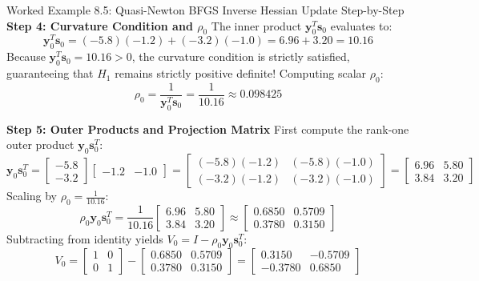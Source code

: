 \begin{examplebox}[breakable]{Worked Example 8.5: Quasi-Newton BFGS Inverse Hessian Update Step-by-Step}
\textbf{Step 4: Curvature Condition and $\rho_0$}
The inner product $\mathbf{y}_0^T \mathbf{s}_0$ evaluates to:
\begin{equation*}
\mathbf{y}_0^T \mathbf{s}_0 = (-5.8)(-1.2) + (-3.2)(-1.0) = 6.96 + 3.20 = \mathbf{10.16}
\end{equation*}
Because $\mathbf{y}_0^T \mathbf{s}_0 = 10.16 > 0$, the curvature condition is strictly satisfied, guaranteeing that $H_1$ remains strictly positive definite!
Computing scalar $\rho_0$:
\begin{equation*}
\rho_0 = \frac{1}{\mathbf{y}_0^T \mathbf{s}_0} = \frac{1}{10.16} \approx \mathbf{0.098425}
\end{equation*}

\textbf{Step 5: Outer Products and Projection Matrix}
First compute the rank-one outer product $\mathbf{y}_0 \mathbf{s}_0^T$:
\begin{equation*}
\mathbf{y}_0 \mathbf{s}_0^T = \begin{bmatrix} -5.8 \\ -3.2 \end{bmatrix} \begin{bmatrix} -1.2 & -1.0 \end{bmatrix} = \begin{bmatrix} (-5.8)(-1.2) & (-5.8)(-1.0) \\ (-3.2)(-1.2) & (-3.2)(-1.0) \end{bmatrix} = \begin{bmatrix} 6.96 & 5.80 \\ 3.84 & 3.20 \end{bmatrix}
\end{equation*}
Scaling by $\rho_0 = \frac{1}{10.16}$:
\begin{equation*}
\rho_0 \mathbf{y}_0 \mathbf{s}_0^T = \frac{1}{10.16} \begin{bmatrix} 6.96 & 5.80 \\ 3.84 & 3.20 \end{bmatrix} \approx \begin{bmatrix} 0.6850 & 0.5709 \\ 0.3780 & 0.3150 \end{bmatrix}
\end{equation*}
Subtracting from identity yields $V_0 = I - \rho_0 \mathbf{y}_0 \mathbf{s}_0^T$:
\begin{equation*}
V_0 = \begin{bmatrix} 1 & 0 \\ 0 & 1 \end{bmatrix} - \begin{bmatrix} 0.6850 & 0.5709 \\ 0.3780 & 0.3150 \end{bmatrix} = \begin{bmatrix} 0.3150 & -0.5709 \\ -0.3780 & 0.6850 \end{bmatrix}

\end{equation*}
\end{examplebox}
